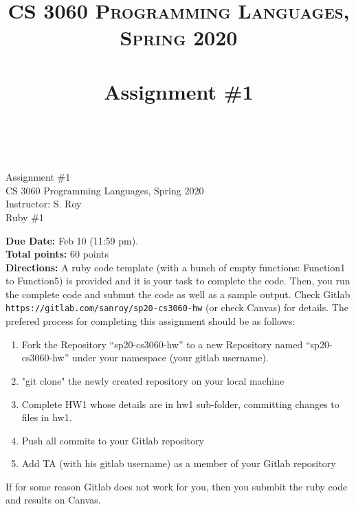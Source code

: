 \documentclass[paper=letter, fontsize=11pt]{scrartcl} %
\title{ 
    \normalfont \normalsize 
    \textsc{CS 3060 Programming Languages, Spring 2020} \\ [25pt] %
    \horrule{0.5pt} \\[0.4cm] %
    \huge Assignment \#1  \\ %
    \horrule{2pt} \\[0.5cm] %
}
\begin{document}
    \begin{center}
         Assignment \#1\\
        \small CS 3060 Programming Languages, Spring 2020 \\
        \small Instructor: S. Roy \\
        \huge Ruby \#1
    \end{center}
    
    \textbf{Due Date:}  Feb 10 (11:59 pm).\\

    \textbf{Total points:} 60 points \\

    \textbf{Directions:} A ruby code template (with a bunch of empty functions: Function1 to Function5) is provided and it is your task to complete the code. 
Then, you run the complete code and submut the code as well as a sample output. 
Check Gitlab \@ \texttt{https://gitlab.com/sanroy/sp20-cs3060-hw} (or check Canvas) for details. 
The prefered process for completing this assignment should be as follows:

    \begin{enumerate}[noitemsep]
        \item Fork the Repository ``sp20-cs3060-hw'' to a new Repository named ``sp20-cs3060-hw'' under your namespace (your gitlab username).
        \item "git clone" the newly created repository on your local machine
        \item Complete HW1 whose details are in hw1 sub-folder, committing changes to files in hw1. 
        \item Push all commits to your Gitlab repository
        \item Add TA (with his gitlab username) as a member of your Gitlab repository
    \end{enumerate}

If for some reason Gitlab does not work for you, then you submbit the ruby code and results on Canvas.
\end{document}
